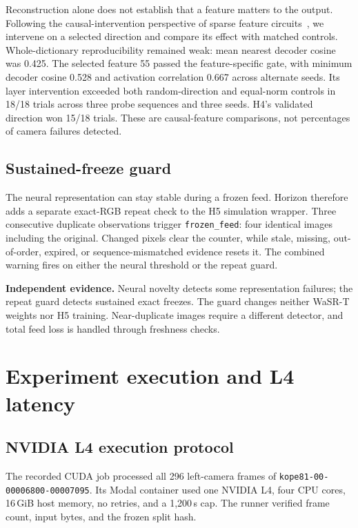 \documentclass[sigconf,nonacm]{acmart}
\newcommand{\callout}[1]{\par\vspace{4pt}\noindent\colorbox{pale}{\parbox{\dimexpr\linewidth-2\fboxsep\relax}{\small #1}}\par\vspace{4pt}}
\begin{document}
Reconstruction alone does not establish that a feature matters to the output. Following the causal-intervention perspective of sparse feature circuits~\cite{marks}, we intervene on a selected direction and compare its effect with matched controls. Whole-dictionary reproducibility remained weak: mean nearest decoder cosine was 0.425. The selected feature 55 passed the feature-specific gate, with minimum decoder cosine 0.528 and activation correlation 0.667 across alternate seeds. Its layer intervention exceeded both random-direction and equal-norm controls in 18/18 trials across three probe sequences and three seeds. H4's validated direction won 15/18 trials. These are causal-feature comparisons, not percentages of camera failures detected.

\subsection{Sustained-freeze guard}
The neural representation can stay stable during a frozen feed. Horizon therefore adds a separate exact-RGB repeat check to the H5 simulation wrapper. Three consecutive duplicate observations trigger \texttt{frozen\_feed}: four identical images including the original. Changed pixels clear the counter, while stale, missing, out-of-order, expired, or sequence-mismatched evidence resets it. The combined warning fires on either the neural threshold or the repeat guard.

\callout{\textbf{Independent evidence.} Neural novelty detects some representation failures; the repeat guard detects sustained exact freezes. The guard changes neither WaSR-T weights nor H5 training. Near-duplicate images require a different detector, and total feed loss is handled through freshness checks.}




\section{Experiment execution and L4 latency}

\subsection{NVIDIA L4 execution protocol}
The recorded CUDA job processed all 296 left-camera frames of \texttt{kope81-00-00006800-}\allowbreak\texttt{00007095}. Its Modal container used one NVIDIA L4, four CPU cores, 16\,GiB host memory, no retries, and a 1,200\,s cap. The runner verified frame count, input bytes, and the frozen split hash.
\end{document}
